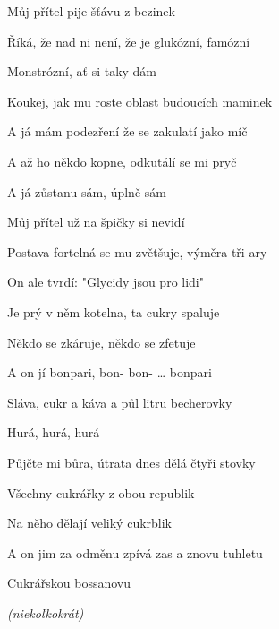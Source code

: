 \begin{song}
Můj přítel  pije šťávu z bezinek  \par
Říká, že nad ni není, že je glukózní, famózní \par
{}Monstrózní, ať si taky dám \par
Koukej, jak mu roste  oblast budoucích maminek  \par
A já mám podezření že se zakulatí jako míč \par
A až ho někdo kopne, odkutálí se mi pryč \par
A já zůstanu sám,  úplně sám  \par

\bigskip
\Refren
\bigskip

Můj přítel  už na špičky si nevidí  \par
Postava fortelná se mu zvětšuje, výměra tři ary  \par
On ale tvrdí:  "Glycidy jsou pro lidi"\  \par
Je prý v něm kotelna, ta cukry spaluje \par
Někdo se zkáruje, někdo se zfetuje \par
A on jí bonpari, bon- bon- …   bonpari  \par

\bigskip

Sláva,  cukr a káva a půl litru becherovky \par
{}Hurá, hurá, hurá \par
Půjčte mi bůra, útrata dnes dělá čtyři stovky \par
Všechny cukrářky z obou republik \par
Na něho dělají veliký cukrblik \par
A on jim za odměnu zpívá zas a znovu tuhletu  \par
Cukrářskou bossanovu    \par

\bigskip

\Outro \par
{}    \textit{(niekoľkokrát)} \par
{} \par

\end{song}
